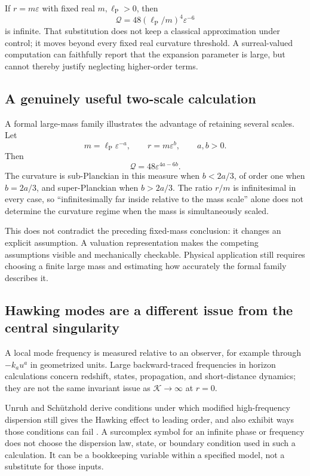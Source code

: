 \documentclass[11pt,a4paper]{article}
\numberwithin{equation}{section}
\theoremstyle{definition}
\theoremstyle{remark}
\newcommand{\eps}{\varepsilon}
\newcommand{\lp}{\ell_{\mathrm P}}
\newcommand{\Krets}{\mathcal K}
\begin{document}
If $r=m\eps$ with fixed real $m,\lp>0$, then
\begin{equation}
 \mathcal Q=48(\lp/m)^4\eps^{-6}
\end{equation}
is infinite. That substitution does not keep a classical approximation under control; it moves beyond every fixed real curvature threshold. A surreal-valued computation can faithfully report that the expansion parameter is large, but cannot thereby justify neglecting higher-order terms.

\subsection{A genuinely useful two-scale calculation}
A formal large-mass family illustrates the advantage of retaining several scales. Let
\begin{equation}
 m=\lp\eps^{-a},\qquad r=m\eps^b,\qquad a,b>0.
\end{equation}
Then
\begin{equation}\label{eq:twoscale}
 \mathcal Q=48\eps^{4a-6b}.
\end{equation}
The curvature is sub-Planckian in this measure when $b<2a/3$, of order one when $b=2a/3$, and super-Planckian when $b>2a/3$. The ratio $r/m$ is infinitesimal in every case, so ``infinitesimally far inside relative to the mass scale'' alone does not determine the curvature regime when the mass is simultaneously scaled.

This does not contradict the preceding fixed-mass conclusion: it changes an explicit assumption. A valuation representation makes the competing assumptions visible and mechanically checkable. Physical application still requires choosing a finite large mass and estimating how accurately the formal family describes it.

\subsection{Hawking modes are a different issue from the central singularity}
A local mode frequency is measured relative to an observer, for example through $-k_a u^a$ in geometrized units. Large backward-traced frequencies in horizon calculations concern redshift, states, propagation, and short-distance dynamics; they are not the same invariant issue as $\Krets\to\infty$ at $r=0$.

Unruh and Sch\"utzhold derive conditions under which modified high-frequency dispersion still gives the Hawking effect to leading order, and also exhibit ways those conditions can fail \cite{Unruh}. A surcomplex symbol for an infinite phase or frequency does not choose the dispersion law, state, or boundary condition used in such a calculation. It can be a bookkeeping variable within a specified model, not a substitute for those inputs.
\end{document}

